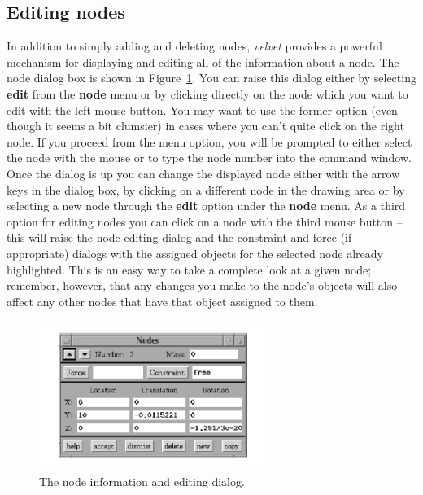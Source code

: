 \subsection{Editing nodes}
In addition to simply adding and deleting nodes, {\em velvet} provides
a powerful mechanism for displaying and editing all of the information
about a node.  The node dialog box is shown in Figure~\ref{velvet.node}.  
You can raise this dialog either by selecting {\bf edit} from the 
{\bf node} menu or by clicking directly 
on the node which you want to edit with the left mouse button.  You may want
to use the former option (even though it seems a bit clumsier) in cases
where you can't quite click on the right node.  If you proceed from the
menu option, you will be prompted to either select the node with the mouse
or to type the node number into the command window.  Once the dialog
is up you can change the displayed node either with the arrow keys in the
dialog box, by clicking on a different node in the drawing area or by selecting
a new node through the {\bf edit} option under the {\bf node} menu.
As a third option for editing nodes you can click on a node with the
third mouse button -- this will raise the node editing dialog and the
constraint and force (if appropriate) dialogs with the assigned objects for 
the selected node already highlighted.  This is an easy way to take
a complete look at a given node; remember, however, that any changes you make
to the node's objects will also affect any other nodes that have that
object assigned to them.

\begin{figure}
\begin{center}
 \includegraphics[width=2.91in]{figures/velvet_node}
\end{center}
\caption{The node information and editing dialog.}
\label{velvet.node}
\end{figure}

